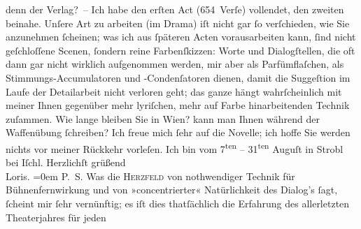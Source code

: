 \begin{ledgroupsized}[t]{13cm}
               denn der Verlag? –\pend
           \pstart
           Ich habe den erſten Act
               (654 Verſe) vollendet, den zweiten beinahe.\pend
           \pstart
           Unſere Art zu arbeiten (im Drama) iſt nicht gar ſo verſchieden, wie Sie anzunehmen
               ſcheinen; was ich {\pb}aus ſpäteren
               Acten vorausarbeiten kann, ſind nicht geſchloſſene Scenen, ſondern reine
               Farbenſkizzen: Worte und Dialogſtellen, die oft dann gar nicht wirklich aufgenommen
               werden, mir aber als Parfümflaſchen, als Stimmungs-Accumulatoren und -Condenſatoren
               dienen, damit die Suggeſtion im Laufe der Detailarbeit nicht verloren geht; das ganze
               hängt wahrſcheinlich mit meiner Ihnen gegenüber mehr lyriſchen, mehr auf Farbe
               hinarbeitenden Technik zuſammen. Wie lange {\pb}bleiben Sie in Wien? kann man Ihnen während der Waffenübung ſchreiben?\pend
           \pstart
           Ich freue mich ſehr auf die Novelle; ich hoffe Sie
               werden nichts vor meiner Rückkehr vorleſen.\pend
           \pstart
           Ich bin vom 7\textsuperscript{ten} – 31\textsuperscript{ten} Auguſt in Strobl bei Iſchl.\pend
           \pstart
           Herzlichſt grüßend{\\[\baselineskip]}\spacefill\mbox{Loris.}\pend
           \leftskip=0em{}\pstart
           \noindent{}\textsc{P. S.} Was die \textsc{Herzfeld} von nothwendiger Technik  für
                  Bühnenfernwirkung und von »concentrierter« Natürlichkeit des Dialog’s ſagt,
                  ſcheint mir ſehr vernünftig; {\pb}es iſt dies thatſächlich die Erfahrung des allerletzten Theaterjahres für jeden

\end{ledgroupsized}
